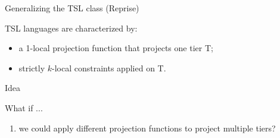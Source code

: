 \documentclass[xcolor={usenames,svgnames,x11names,table}]{beamer}
\begin{document}
 \begin{frame}{Generalizing the TSL class (Reprise)}

        TSL languages are characterized by:
        
        \begin{itemize}
        \item a \alert{1}-local projection function that projects \alert{one} tier T;
        \item strictly $k$-local constraints applied on T.
        \end{itemize} 
        
        
        
        \begin{block}{Idea}
        
        What if ...
        \begin{enumerate}
        \item we could apply different projection functions to project \alert{multiple tiers}?
        \end{enumerate}
        
        \end{block}
         
\end{frame}    
\end{document}
